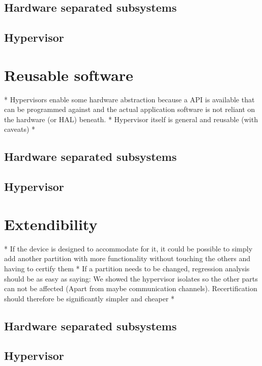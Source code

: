 \subsection{Hardware separated subsystems}
\subsection{Hypervisor}


\section{Reusable software}
* Hypervisors enable some hardware abstraction because a API is available that can be programmed against and the actual application software is not reliant on the hardware (or HAL) beneath.
* Hypervisor itself is general and reusable (with caveats)
* 
\subsection{Hardware separated subsystems}
\subsection{Hypervisor}


\section{Extendibility}
* If the device is designed to accommodate for
it, it could be possible to simply add another partition with more functionality without touching the others and having to certify them
* If a partition needs to be changed, regression analysis should be as easy as saying: We showed the hypervisor isolates so the other parts can not be affected (Apart from maybe communication channels). Recertification should therefore be significantly simpler and cheaper
* 
\subsection{Hardware separated subsystems}
\subsection{Hypervisor}

